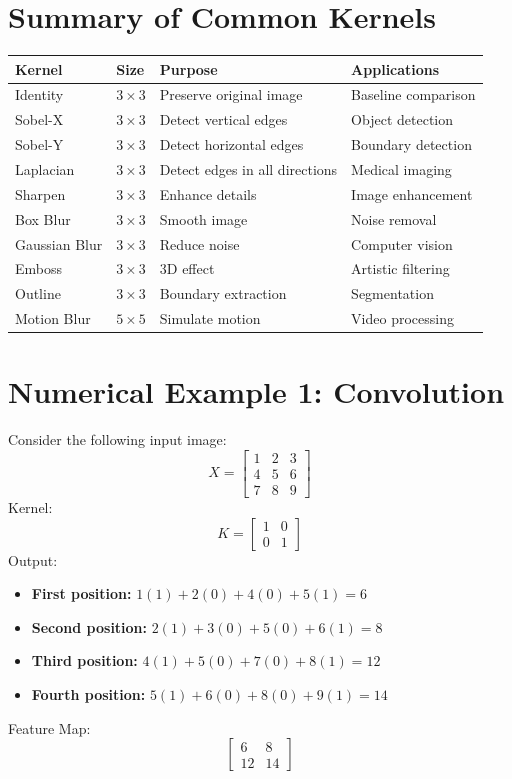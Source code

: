 \documentclass[11pt]{article}
\begin{document}
\section{Summary of Common Kernels}
\begin{table}[!htbp]
\centering
\begin{tabular}{|l|l|l|l|}
\hline
\textbf{Kernel} & \textbf{Size} & \textbf{Purpose} & \textbf{Applications} \\ \hline
Identity & $3\times3$ & Preserve original image & Baseline comparison \\ \hline
Sobel-X & $3\times3$ & Detect vertical edges & Object detection \\ \hline
Sobel-Y & $3\times3$ & Detect horizontal edges & Boundary detection \\ \hline
Laplacian & $3\times3$ & Detect edges in all directions & Medical imaging \\ \hline
Sharpen & $3\times3$ & Enhance details & Image enhancement \\ \hline
Box Blur & $3\times3$ & Smooth image & Noise removal \\ \hline
Gaussian Blur & $3\times3$ & Reduce noise & Computer vision \\ \hline
Emboss & $3\times3$ & 3D effect & Artistic filtering \\ \hline
Outline & $3\times3$ & Boundary extraction & Segmentation \\ \hline
Motion Blur & $5\times5$ & Simulate motion & Video processing \\ \hline
\end{tabular}
\end{table}

\section{Numerical Example 1: Convolution}
Consider the following input image:
\[
X = \begin{bmatrix} 1 & 2 & 3 \\ 4 & 5 & 6 \\ 7 & 8 & 9 \end{bmatrix}
\]
Kernel:
\[
K = \begin{bmatrix} 1 & 0 \\ 0 & 1 \end{bmatrix}
\]
Output:
\begin{itemize}[label={}]
    \item \textbf{First position:} $1(1) + 2(0) + 4(0) + 5(1) = 6$
    \item \textbf{Second position:} $2(1) + 3(0) + 5(0) + 6(1) = 8$
    \item \textbf{Third position:} $4(1) + 5(0) + 7(0) + 8(1) = 12$
    \item \textbf{Fourth position:} $5(1) + 6(0) + 8(0) + 9(1) = 14$
\end{itemize}
Feature Map:
\[
\begin{bmatrix} 6 & 8 \\ 12 & 14 \end{bmatrix}
\]
\end{document}
